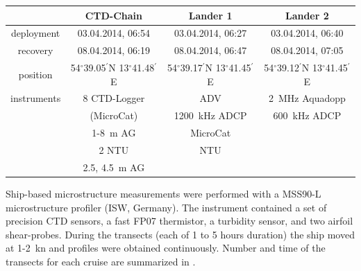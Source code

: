 \begin{table}
\begin{center}
\begin{tabular}{cccc}
& CTD-Chain & Lander 1 & Lander 2 \\
\hline
 deployment & 03.04.2014, 06:54 & 03.04.2014, 06:27 & 03.04.2014, 06:40 \\ 
 recovery & 08.04.2014, 06:19 & 08.04.2014, 06:47 & 08.04.2014, 07:05 \\
\hline
position & 54$^\circ$39.05$^\prime$N 13$^\circ$41.48$^\prime$E & 
54$^\circ$39.17$^\prime$N 13$^\circ$41.45$^\prime$E & 54$^\circ$39.12$^\prime$N 
13$^\circ$41.45$^\prime$E \\
\hline
instruments & 8 CTD-Logger & ADV & 2~MHz Aquadopp \\
 & (MicroCat) & 1200~kHz ADCP & 600~kHz ADCP\\
 & 1-8~m AG & MicroCat & \\
 & 2 NTU & NTU & \\
 & 2.5, 4.5~m AG & & \\
 \end{tabular}
\end{center}
\end{table}

Ship-based microstructure measurements were performed with a MSS90-L 
microstructure profiler (ISW, Germany). The instrument contained a set of 
precision CTD sensors, a fast FP07 thermistor, a turbidity sensor, and two 
airfoil shear-probes. During the transects (each of 1 to 5 hours duration) the 
ship moved at 1-2~kn and profiles were obtained continuously. Number and time 
of the transects for each cruise are summarized in .

